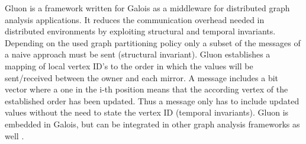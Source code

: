 Gluon \cite{vertGalois} is a framework written for Galois as a middleware for distributed graph analysis applications. It reduces the communication overhead needed in distributed environments by exploiting structural and temporal invariants. Depending on the used graph partitioning policy only a subset of the messages of a naive approach must be sent (structural invariant). Gluon establishes a mapping of local vertex ID's to the order in which the values will be sent/received between the owner and each mirror. A message includes a bit vector where a one in the i-th position means that the according vertex of the established order has been updated. Thus a message only has to include updated values without the need to state the vertex ID (temporal invariants). Gluon is embedded in Galois, but can be integrated in other graph analysis frameworks as well \cite{vertGalois}.

